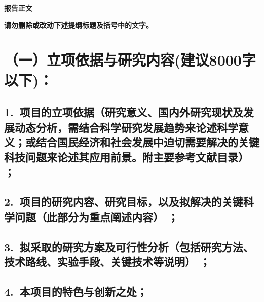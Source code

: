 \documentclass[12pt,UTF8,AutoFakeBold=2.5,a4paper]{ctexart} %
\newcommand{\sanhao}{\fontsize{16pt}{\baselineskip}\selectfont}
\newcommand{\sihao}{\fontsize{14pt}{\baselineskip}\selectfont}
\begin{document}

\begin{center}
{\sanhao \kaishu \bfseries 报告正文}
\end{center}

{\sihao \kaishu \bfseries \color{MsBlue} \hspace{0.2em} 请勿删除或改动下述提纲标题及括号中的文字。}
\vskip -5mm

\section{\hspace{-0.9em} {\bfseries（一）立项依据与研究内容}(建议8000字以下)：} 
\subsection{\hspace{1.45em} 1.~{\bfseries 项目的立项依据}（研究意义、国内外研究现状及发展动态分析，需结合科学研究发展趋势来论述科学意义；或结合国民经济和社会发展中迫切需要解决的关键科技问题来论述其应用前景。附主要参考文献目录）\hspace{-14pt} ；}






\subsection{\hspace{1.45em} 2.~{\bfseries 项目的研究内容、研究目标，以及拟解决的关键科学问题}（此部分为重点阐述内容）\hspace{-14pt} {\bfseries ；}}



\subsection{\hspace{1.45em}  3.~{\bfseries 拟采取的研究方案及可行性分析}（包括研究方法、技术路线、实验手段、关键技术等说明）\hspace{-14pt} ；}



\subsection{\hspace{1.45em}  4.~{\bfseries 本项目的特色与创新之处；}}
\end{document}
